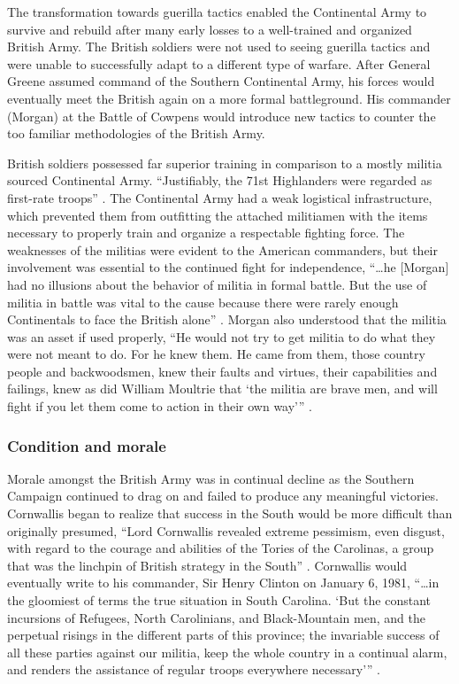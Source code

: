 The transformation towards guerilla tactics enabled the Continental Army to
survive and rebuild after many early losses to a well-trained and organized
British Army.  The British soldiers were not used to seeing guerilla tactics and
were unable to successfully adapt to a different type of warfare.  After General
Greene assumed command of the Southern Continental Army, his forces would
eventually meet the British again on a more formal battleground.  His commander
(Morgan) at the Battle of Cowpens would introduce new tactics to counter the too
familiar methodologies of the British Army.  

British soldiers possessed far superior training in comparison to a mostly
militia sourced Continental Army. “Justifiably, the 71st Highlanders were
regarded as first-rate troops” \cite[p.45]{babits_devil_2001}. The Continental Army had a weak
logistical infrastructure, which prevented them from outfitting the attached
militiamen with the items necessary to properly train and organize a respectable
fighting force.  The weaknesses of the militias were evident to the American
commanders, but their involvement was essential to the continued fight for
independence, “…he [Morgan] had no illusions about the behavior of militia in
formal battle.  But the use of militia in battle was vital to the cause because
there were rarely enough Continentals to face the British alone”
\cite[316]{buchanan_road_1997}.  Morgan also understood that the militia was an asset if used properly,
“He would not try to get militia to do what they were not meant to do.  For he
knew them.  He came from them, those country people and backwoodsmen, knew their
faults and virtues, their capabilities and failings, knew as did William
Moultrie that ‘the militia are brave men, and will fight if you let them come to
action in their own way’” \cite[p.316]{buchanan_road_1997}.  

\subsubsection{Condition and morale}

Morale amongst the British Army was in continual decline as the Southern
Campaign continued to drag on and failed to produce any meaningful victories.
Cornwallis began to realize that success in the South would be more difficult
than originally presumed, “Lord Cornwallis revealed extreme pessimism, even
disgust, with regard to the courage and abilities of the Tories of the
Carolinas, a group that was the linchpin of British strategy in the South”
\cite[p.306]{buchanan_road_1997}.  Cornwallis would eventually write to his commander, Sir
Henry Clinton on January 6, 1981, “…in the gloomiest of terms the true situation
in South Carolina.  ‘But the constant incursions of Refugees, North Carolinians,
and Black-Mountain men, and the perpetual risings in the different parts of this
province; the invariable success of all these parties against our militia, keep
the whole country in a continual alarm, and renders the assistance of regular
troops everywhere necessary’” \cite[pp.306-7]{buchanan_road_1997}. 

